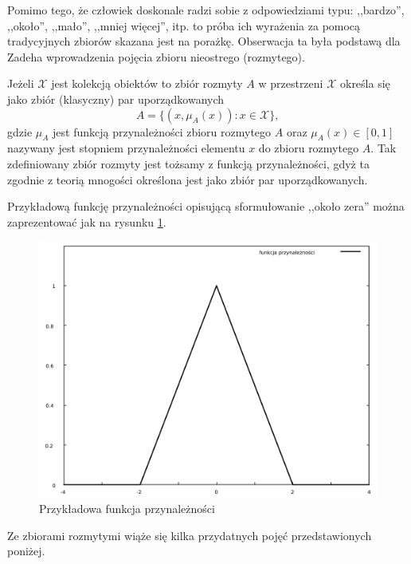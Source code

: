 Pomimo tego, że człowiek doskonale radzi sobie z odpowiedziami typu: ,,bardzo'',
,,około'', ,,mało'', ,,mniej więcej'', itp. to próba ich wyrażenia za pomocą
tradycyjnych zbiorów skazana jest na porażkę. Obserwacja ta była podstawą dla
Zadeha wprowadzenia pojęcia zbioru nieostrego (rozmytego).

\begin{definition}
Jeżeli $\mathcal{X}$ jest kolekcją obiektów to zbiór rozmyty $A$ w przestrzeni
$\mathcal{X}$ określa się jako zbiór (klasyczny) par uporządkowanych
\begin{equation}
A = \{ (x, \mu_A(x)) : x \in \mathcal{X} \},
\end{equation}
gdzie $\mu_A$ jest funkcją przynależności zbioru rozmytego $A$ oraz $\mu_A(x)
\in [0,1]$ nazywany jest stopniem przynależności elementu $x$ do zbioru
rozmytego $A$. Tak zdefiniowany zbiór rozmyty jest tożsamy z funkcją
przynależności, gdyż ta zgodnie z teorią mnogości określona jest jako zbiór par
uporządkowanych.
\end{definition}

Przykładową funkcję przynależności opisującą sformułowanie ,,około zera'' można
zaprezentować jak na rysunku \ref{fig:funkcja_przynaleznosci}.

\begin{figure}[ht]
  \includegraphics[width=\linewidth]
  	{chapters/fuzzylogic/funkcja_przynaleznosci}
  \caption{Przykładowa funkcja przynależności}
  \label{fig:funkcja_przynaleznosci}
\end{figure}

Ze zbiorami rozmytymi wiąże się kilka przydatnych pojęć przedstawionych poniżej.

